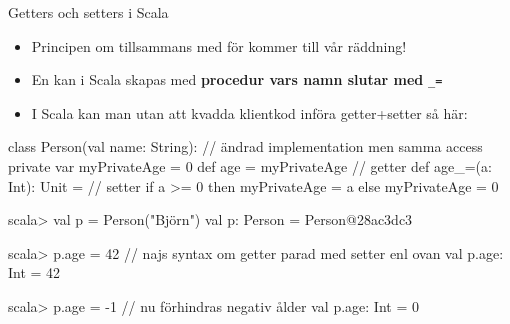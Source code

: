 \begin{Slide}{Getters och setters i Scala}\SlideFontSmall
\setlength{\leftmargini}{0pt}
\begin{itemize}
\item Principen om  tillsammans med  för  kommer till vår räddning!

\item
En  kan i Scala skapas med \textbf{procedur vars namn slutar med} \texttt{\_=}
\pause
\item I Scala kan man utan att kvadda klientkod införa getter+setter så här:
\end{itemize}
\begin{Code}
class Person(val name: String): // ändrad implementation men samma access
  private var myPrivateAge = 0
  def age = myPrivateAge         // getter
  def age_=(a: Int): Unit =      // setter
    if a >= 0 then myPrivateAge = a else myPrivateAge = 0
\end{Code}
\pause\vspace{-0.5em}
\begin{REPL}
scala> val p = Person("Björn")
val p: Person = Person@28ac3dc3

scala> p.age = 42      // najs syntax om getter parad med setter enl ovan
val p.age: Int = 42

scala> p.age = -1      // nu förhindras negativ ålder
val p.age: Int = 0
\end{REPL}
\end{Slide}


